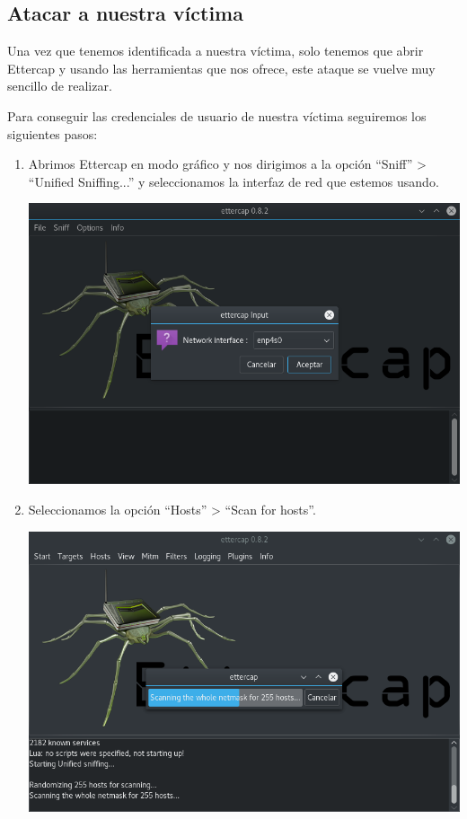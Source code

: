 \subsection{Atacar a nuestra víctima}
Una vez que tenemos identificada a nuestra víctima, solo tenemos que abrir Ettercap y usando las herramientas que nos ofrece, este ataque se vuelve muy sencillo de realizar.

Para conseguir las credenciales de usuario de nuestra víctima seguiremos los siguientes pasos:
\newpage
\begin{enumerate}
	\item Abrimos Ettercap en modo gráfico y nos dirigimos a la opción ``Sniff'' > ``Unified Sniffing...'' y seleccionamos la interfaz de red que estemos usando.
	\begin{center}
		\includegraphics[scale=0.5]{e1.png}
	\end{center}
	\item Seleccionamos la opción ``Hosts'' > ``Scan for hosts''.
	\begin{center}
		\includegraphics[scale=0.5]{e2.png}

\end{center}
\end{enumerate}
